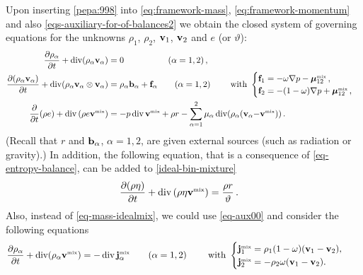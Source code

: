 \documentclass[a4paper]{article}
\begin{document}
Upon inserting \eqref{pepa:998} into \eqref{eq:framework-mass}, \eqref{eq:framework-momentum} and also \eqref{eqs-auxiliary-for-of-balances2} we obtain the closed system of governing equations for the unknowns $\rho_1$, $\rho_2$, ${\bf v}_1$, ${\bf v}_2$ and $e$ (or $\vartheta$): 
\begin{subequations}
\label{ideal-bin-mixture}
\begin{align}
\frac{\partial \rho_\alpha}{\partial t} + \mathop{\rm div}\nolimits(\rho_\alpha{\bf v}_\alpha) & =  0 \,\quad\qquad\qquad (\alpha=1,2)\,, \label{eq-mass-idealmix}\\
\frac{\partial(\rho_\alpha{\bf v}_\alpha)}{\partial t} + \mathop{\rm div}\nolimits(\rho_\alpha{\bf v}_\alpha\otimes{\bf v}_\alpha) &= \rho_\alpha{\bf{b}}_\alpha + \mathbf{f}_{\alpha} \qquad  (\alpha=1,2) \qquad \textrm{ with } \begin{cases} \mathbf{f}_1 = - \omega \nabla p - \boldsymbol{\mu}_{12}^{\mbox{\tiny{mix}}}\,, \\
\mathbf{f}_2 = - (1- \omega) \nabla p + \boldsymbol{\mu}_{12}^{\mbox{\tiny{mix}}}\,,
\end{cases} \label{eq-momentum-idealmix}\\
\frac{\partial}{\partial t}(\rho e) + \mathop{\rm div}\nolimits\left(\rho e{\bf v}^{\mbox{\tiny{mix}}}\right) &=  -p \mathop{\rm div}\nolimits{\bf v}^{\mbox{\tiny{mix}}} + \rho r - \sum_{\alpha=1}^2\mu_\alpha\mathop{\rm div}\nolimits(\rho_\alpha({\bf v}_\alpha{-}{\bf v}^{\mbox{\tiny{mix}}}))\,. \label{eq-energy-idelamix} 
\end{align}
\end{subequations}
(Recall that $r$ and ${\bf{b}}_\alpha$, $\alpha = 1,2$, are given external sources (such as radiation or gravity).) In addition, the following equation, that is a consequence of \eqref{eq-entropy-balance}, can be added to \eqref{ideal-bin-mixture}
\begin{align} 
\label{eq-entropy-idealmix}
\frac{\partial(\rho\eta)}{\partial t} + \mathop{\rm div}\nolimits\left(\rho\eta{\bf v}^{\mbox{\tiny{mix}}}\right) &=  \frac{\rho r}{\vartheta}\,.
\end{align}
Also, instead of \eqref{eq-mass-idealmix}, we could use \eqref{eq-aux00} and consider the following equations
\begin{align}
\frac{\partial \rho_\alpha}{\partial t} + \mathop{\rm div}\nolimits(\rho_\alpha{\bf v}^{\mbox{\tiny{mix}}}) & =  - \mathop{\rm div}\nolimits{\bf j}^{\mbox{\tiny{mix}}}_\alpha \qquad(\alpha=1,2) \qquad \textrm{ with } \begin{cases} {\bf j}^{\mbox{\tiny{mix}}}_1 = \rho_1 (1-\omega)({\bf v}_1-{\bf v}_2), \\ {\bf j}^{\mbox{\tiny{mix}}}_2 = - \rho_2 \omega ({\bf v}_1-{\bf v}_2). \end{cases}\label{eq-mass-idealmix2}
\end{align}
\end{document}
